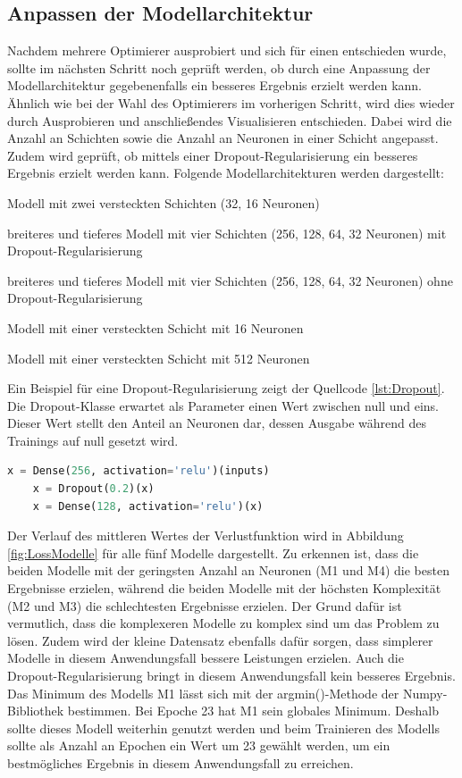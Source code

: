 \subsection{Anpassen der Modellarchitektur}
Nachdem mehrere Optimierer ausprobiert und sich für einen entschieden wurde, sollte im nächsten Schritt noch geprüft werden, ob durch eine Anpassung der Modellarchitektur
gegebenenfalls ein besseres Ergebnis erzielt werden kann. Ähnlich wie bei der Wahl des Optimierers im vorherigen Schritt, wird dies wieder durch Ausprobieren und 
anschließendes Visualisieren entschieden. Dabei wird die Anzahl an Schichten sowie die Anzahl an Neuronen in einer Schicht angepasst.
Zudem wird geprüft, ob mittels einer Dropout-Regularisierung ein besseres Ergebnis erzielt werden kann. 
Folgende Modellarchitekturen werden dargestellt:
\begin{description}[style=multiline,leftmargin=3cm,font=\bfseries, nolistsep]
    \item[M1] Modell mit zwei versteckten Schichten (32, 16 Neuronen)
    \item[M2] breiteres und tieferes Modell mit vier Schichten (256, 128, 64, 32 Neuronen) mit Dropout-Regularisierung
    \item[M3] breiteres und tieferes Modell mit vier Schichten (256, 128, 64, 32 Neuronen) ohne Dropout-Regularisierung
    \item[M4] Modell mit einer versteckten Schicht mit 16 Neuronen
    \item[M5] Modell mit einer versteckten Schicht mit 512 Neuronen
\end{description}
Ein Beispiel für eine Dropout-Regularisierung zeigt der Quellcode \ref*{lst:Dropout}. Die Dropout-Klasse erwartet als Parameter einen Wert zwischen null und eins. 
Dieser Wert stellt den Anteil an Neuronen dar, dessen Ausgabe während des Trainings auf null gesetzt wird.
\begin{lstlisting}[language = python, caption={Dropout-Regularisierung mit Keras},captionpos=b, label = lst:Dropout, floatplacement=H]
    x = Dense(256, activation='relu')(inputs)
    x = Dropout(0.2)(x)
    x = Dense(128, activation='relu')(x)
\end{lstlisting}
Der Verlauf des mittleren Wertes der Verlustfunktion wird in Abbildung \ref*{fig:LossModelle} für alle fünf Modelle dargestellt. Zu erkennen ist, dass die beiden Modelle mit 
der geringsten Anzahl an Neuronen (M1 und M4) die besten Ergebnisse erzielen, während die beiden Modelle mit der höchsten Komplexität (M2 und M3) die schlechtesten Ergebnisse
erzielen. Der Grund dafür ist vermutlich, dass die komplexeren Modelle zu komplex sind um das Problem zu lösen. Zudem wird der kleine Datensatz ebenfalls dafür sorgen,
dass simplerer Modelle in diesem Anwendungsfall bessere Leistungen erzielen. Auch die Dropout-Regularisierung bringt in diesem Anwendungsfall kein besseres Ergebnis. Das Minimum
des Modells M1 lässt sich mit der argmin()-Methode der Numpy-Bibliothek bestimmen. Bei Epoche 23 hat M1 sein globales Minimum. Deshalb sollte dieses Modell weiterhin genutzt werden
und beim Trainieren des Modells sollte als Anzahl an Epochen ein Wert um 23 gewählt werden, um ein bestmögliches Ergebnis in diesem Anwendungsfall zu erreichen.

